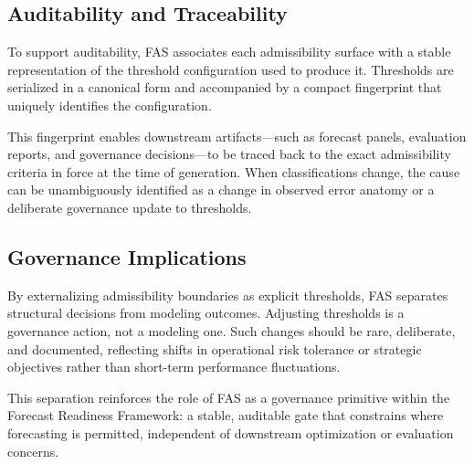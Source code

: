 \subsection{Auditability and Traceability}

To support auditability, FAS associates each admissibility surface with a stable
representation of the threshold configuration used to produce it. Thresholds
are serialized in a canonical form and accompanied by a compact fingerprint that
uniquely identifies the configuration.

This fingerprint enables downstream artifacts—such as forecast panels,
evaluation reports, and governance decisions—to be traced back to the exact
admissibility criteria in force at the time of generation. When classifications
change, the cause can be unambiguously identified as a change in observed error
anatomy or a deliberate governance update to thresholds.

\subsection{Governance Implications}

By externalizing admissibility boundaries as explicit thresholds, FAS separates
structural decisions from modeling outcomes. Adjusting thresholds is a
governance action, not a modeling one. Such changes should be rare, deliberate,
and documented, reflecting shifts in operational risk tolerance or strategic
objectives rather than short-term performance fluctuations.

This separation reinforces the role of FAS as a governance primitive within the
Forecast Readiness Framework: a stable, auditable gate that constrains where
forecasting is permitted, independent of downstream optimization or evaluation
concerns.
